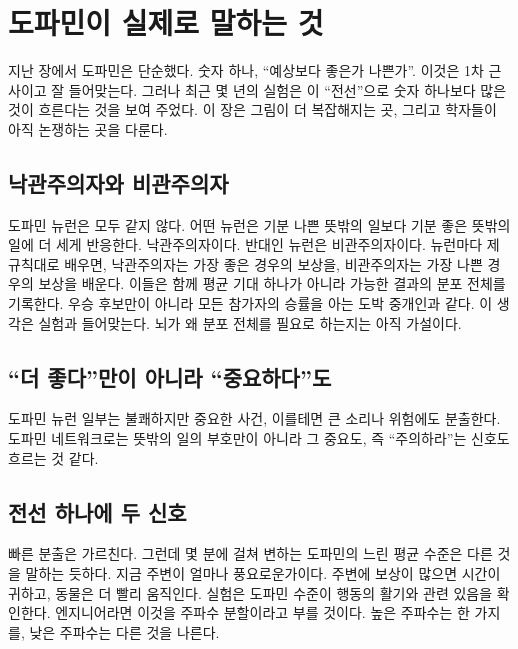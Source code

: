 \chapter{도파민이 실제로 말하는 것}

지난 장에서 도파민은 단순했다. 숫자 하나, “예상보다 좋은가 나쁜가”. 이것은 1차 근사이고 잘 들어맞는다. 그러나 최근 몇 년의 실험은 이 “전선”으로 숫자 하나보다 많은 것이 흐른다는 것을 보여 주었다. 이 장은 그림이 더 복잡해지는 곳, 그리고 학자들이 아직 논쟁하는 곳을 다룬다.

\section*{낙관주의자와 비관주의자}

도파민 뉴런은 모두 같지 않다. 어떤 뉴런은 기분 나쁜 뜻밖의 일보다 기분 좋은 뜻밖의 일에 더 세게 반응한다. 낙관주의자이다. 반대인 뉴런은 비관주의자이다. 뉴런마다 제 규칙대로 배우면, 낙관주의자는 가장 좋은 경우의 보상을, 비관주의자는 가장 나쁜 경우의 보상을 배운다. 이들은 함께 평균 기대 하나가 아니라 가능한 결과의 분포 전체를 기록한다. 우승 후보만이 아니라 모든 참가자의 승률을 아는 도박 중개인과 같다. 이 생각은 실험과 들어맞는다. 뇌가 왜 분포 전체를 필요로 하는지는 아직 가설이다.


\section*{“더 좋다”만이 아니라 “중요하다”도}

도파민 뉴런 일부는 불쾌하지만 중요한 사건, 이를테면 큰 소리나 위험에도 분출한다. 도파민 네트워크로는 뜻밖의 일의 부호만이 아니라 그 중요도, 즉 “주의하라”는 신호도 흐르는 것 같다.

\section*{전선 하나에 두 신호}

빠른 분출은 가르친다. 그런데 몇 분에 걸쳐 변하는 도파민의 느린 평균 수준은 다른 것을 말하는 듯하다. 지금 주변이 얼마나 풍요로운가이다. 주변에 보상이 많으면 시간이 귀하고, 동물은 더 빨리 움직인다. 실험은 도파민 수준이 행동의 활기와 관련 있음을 확인한다. 엔지니어라면 이것을 주파수 분할이라고 부를 것이다. 높은 주파수는 한 가지를, 낮은 주파수는 다른 것을 나른다.


